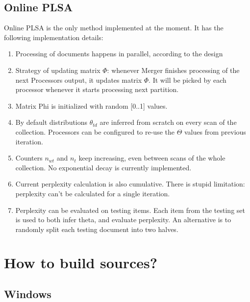 \documentclass[11pt,a4paper,twoside]{report}
\begin{document}
\subsection{Online PLSA}
Online PLSA is the only method implemented at the moment.
It has the following implementation details:
\begin{enumerate}
    \item Processing of documents happens in parallel, according to the design
    \item Strategy of updating matrix $\Phi$: whenever Merger finishes processing of the next Processors output,
    it updates matrix $\Phi$. It will be picked by each processor whenever it starts processing next partition.
    \item Matrix Phi is initialized with random [0..1] values.
    \item By default distributions $\theta_{t d}$ are inferred from scratch on every scan of the collection.
          Processors can be configured to re-use the $\Theta$ values from previous iteration.
    \item Counters $n_{w t}$ and $n_t$ keep increasing, even between scans of the whole collection.
          No exponential decay is currently implemented.
    \item Current perplexity calculation is also cumulative.
          There is stupid limitation: perplexity can't be calculated for a single iteration.
    \item Perplexity can be evaluated on testing items.
          Each item from the testing set is used to both infer theta, and evaluate perplexity.
          An alternative is to randomly split each testing document into two halves.
\end{enumerate}

\section{How to build sources?}
\label{label:how_to_build}

\subsection{Windows}
\end{document}

